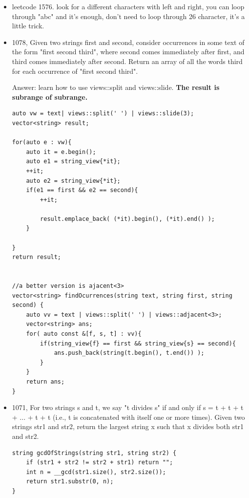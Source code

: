 \documentclass[a4paper,11pt,twoside]{book}
\begin{document}
\begin{itemize}
\begin{lstlisting}
	
	
	int n = sequence.size();
	int i = 0;
	int result{};
	while(i<n){
		auto vv = sequence | views::drop(i);
		string_view sv(vv);
		result = max(result, cntRepeating(sv,word) );
		++i;
	}
	return result;
}
\end{lstlisting}
	
	\item leetcode 1576. look for a different characters with left and right, you can loop through "abc" and it's enough, don't need to loop through 26 character, it's a little trick. 
	
	\item 1078, Given two strings first and second, consider occurrences in some text of the form "first second third", where second comes immediately after first, and third comes immediately after second. Return an array of all the words third for each occurrence of "first second third".
	
	Answer: learn how to use views::split and views::slide. \textbf{The result is subrange of subrange.} 
\begin{lstlisting}
auto vw = text| views::split(' ') | views::slide(3);
vector<string> result;

for(auto e : vw){
	auto it = e.begin();
	auto e1 = string_view{*it};
	++it;
	auto e2 = string_view{*it};
	if(e1 == first && e2 == second){
		++it;                
		
		result.emplace_back( (*it).begin(), (*it).end() );
	}
	
}
return result;	


//a better version is ajacent<3> 
vector<string> findOcurrences(string text, string first, string second) {
	auto vv = text | views::split(' ') | views::adjacent<3>;
	vector<string> ans;
	for( auto const &[f, s, t] : vv){
		if(string_view{f} == first && string_view{s} == second){
			ans.push_back(string(t.begin(), t.end()) );
		}
	}
	return ans;
}
\end{lstlisting}	
	
	\item 1071, For two strings s and t, we say "t divides s" if and only if s = t + t + t + ... + t + t (i.e., t is concatenated with itself one or more times). Given two strings str1 and str2, return the largest string x such that x divides both str1 and str2.
\begin{lstlisting}
string gcdOfStrings(string str1, string str2) {
	if (str1 + str2 != str2 + str1) return "";
	int n = __gcd(str1.size(), str2.size());
	return str1.substr(0, n);
}	
\end{lstlisting}	

\end{itemize}
\end{document}
